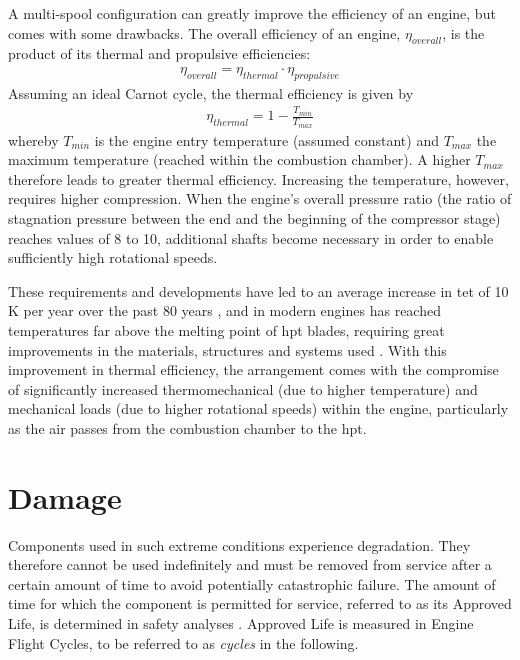 A multi-spool configuration can greatly improve the efficiency of an engine, but comes with some drawbacks. The overall efficiency of an engine, \(\eta_{overall}\), is the product of its thermal and propulsive efficiencies:
\begin{align}
    \eta_{overall} = \eta_{thermal} \cdot \eta_{propulsive}
\end{align}
Assuming an ideal Carnot cycle, the thermal efficiency is given by
\begin{align}
    \eta_{thermal} = 1 - \frac{T_{min}}{T_{max}}
\end{align}
whereby \(T_{min}\) is the engine entry temperature (assumed constant) and \(T_{max}\) the maximum temperature (reached within the combustion chamber). A higher \(T_{max}\) therefore leads to greater thermal efficiency. Increasing the temperature, however, requires %
higher compression. When the engine's overall pressure ratio (the ratio of stagnation pressure between the end and the beginning of the compressor stage) reaches values of 8 to 10, additional shafts become necessary \cite[p. 58]{braunling_flugzeugtriebwerke_2015} in order to enable sufficiently high rotational speeds.

These requirements and developments have led to an average increase in \ac{tet} of 10 K per year over the past 80 years \cite[]{kyprianidis_future_2011}, and in modern engines has reached temperatures far above the melting point of \ac{hpt} blades, requiring great improvements in the materials, structures and systems used \cite[]{spittle_gas_2003}. With this improvement in thermal efficiency, the arrangement comes with the compromise of significantly increased thermomechanical (due to higher temperature) and mechanical loads (due to higher rotational speeds) within the engine, particularly as the air passes from the combustion chamber to the \ac{hpt}.

\section{Damage}\label{damage}
Components used in such extreme conditions experience degradation. They therefore cannot be used indefinitely and must be removed from service after a certain amount of time to avoid potentially catastrophic failure. The amount of time for which the component is permitted for service, referred to as its Approved Life, is determined in safety analyses \cite[]{easa_certification_2015}. Approved Life is measured in Engine Flight Cycles, to be referred to as \textit{cycles} in the following.

